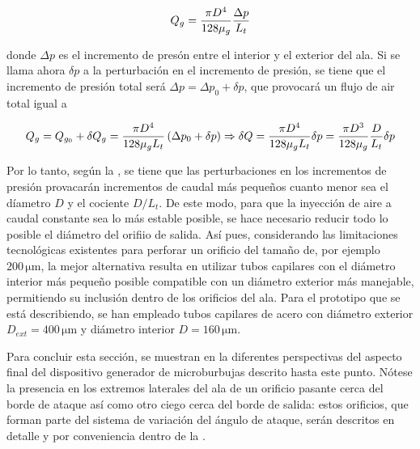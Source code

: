 \begin{equation}
Q_{g} = \dfrac{\pi D^{4}}{128 \mu_{g}}\dfrac{\Delta p}{L_{t}}
\LABEQ{poiseuille}
\end{equation}

donde $\Delta p$ es el incremento de presón entre el interior y el exterior del ala. Si se llama ahora $\delta p$ a la perturbación en el incremento de presión, se tiene que el incremento de presión total será $\Delta p = \Delta p_{0} + \delta p$, que provocará un flujo de air total igual a 

\begin{equation}
Q_{g} = Q_{g_{0}} + \delta Q_{g} = \dfrac{\pi D^{4}}{128 \mu_{g} L_{t}}\left(\Delta p_{0} +  \delta p\right) \Rightarrow \delta Q = \dfrac{\pi D^{4}}{128 \mu_{g} L_{t}}\delta p = \dfrac{\pi D^{3}}{128\mu_{g}}\dfrac{D}{L_{t}}\delta p
\LABEQ{perdidaCarga}
\end{equation}

Por lo tanto, según la , se tiene que las perturbaciones en los incrementos de presión provacarán incrementos de caudal más pequeños cuanto menor sea el díametro $D$ y el cociente $D/L_{t}$. De este modo, para que la inyección de aire a caudal constante sea lo más estable posible, se hace necesario reducir todo lo posible el diámetro del orifiio de salida. Así pues, considerando las limitaciones tecnológicas existentes para perforar un orificio del tamaño de, por ejemplo $200\,\mathrm{\mu m}$, la mejor alternativa resulta en utilizar tubos capilares con el diámetro interior más pequeño posible compatible con un diámetro exterior más manejable, permitiendo su inclusión dentro de los orificios del ala. Para el prototipo que se está describiendo, se han empleado tubos capilares de acero con diámetro exterior $D_{ext} = 400\,\mathrm{\mu m}$ y diámetro interior $D = 160\, \mathrm{\mu m}$. 

Para concluir esta sección, se muestran en la  diferentes perspectivas del aspecto final del dispositivo generador de microburbujas descrito hasta este punto. Nótese la presencia en los extremos laterales del ala de un orificio pasante cerca del borde de ataque así como otro ciego cerca del borde de salida: estos orificios, que forman parte del sistema de variación del ángulo de ataque, serán descritos en detalle y por conveniencia dentro de la . 

